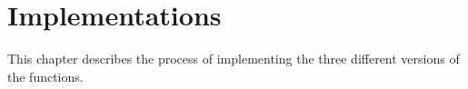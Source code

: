 \chapter{Implementations}
This chapter describes the process of implementing the three different versions of the functions. 
